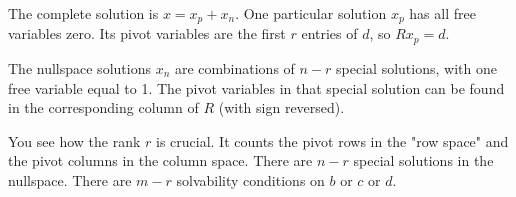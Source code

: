 The complete solution is \(x=x_{p}+x_{n}\). One particular solution \(x_{p}\) has all free variables zero. Its pivot variables are the first \(r\) entries of \(d\), so \(Rx_{p}=d\).

The nullspace solutions \(x_{n}\) are combinations of \(n-r\) special solutions, with one free variable equal to 1. The pivot variables in that special solution can be found in the corresponding column of \(R\) (with sign reversed).

You see how the rank \(r\) is crucial. It counts the pivot rows in the "row space" and the pivot columns in the column space. There are \(n-r\) special solutions in the nullspace. There are \(m-r\) solvability conditions on \(b\) or \(c\) or \(d\).

 